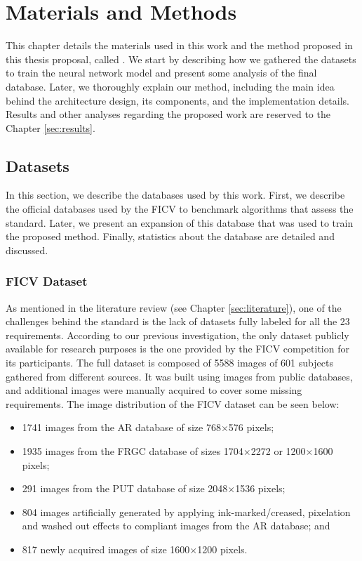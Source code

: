 \section{Materials and Methods} \label{sec:method}

This chapter details the materials used in this work and the method proposed in this thesis proposal, called \methodname. We start by describing how we gathered the datasets to train the neural network model and present some analysis of the final database. Later, we thoroughly explain our method, including the main idea behind the architecture design, its components, and the implementation details. Results and other analyses regarding the proposed work are reserved to the Chapter \ref{sec:results}.

\subsection{Datasets}

In this section, we describe the databases used by this work. First, we describe the official databases used by the FICV to benchmark algorithms that assess the \icao standard. Later, we present an expansion of this database that was used to train the proposed method. Finally, statistics about the database are detailed and discussed.

\subsubsection{FICV Dataset} \label{sec:database}

As mentioned in the literature review (see Chapter \ref{sec:literature}), one of the challenges behind the \icao standard is the lack of datasets fully labeled for all the 23 requirements. According to our previous investigation, the only dataset publicly available for research purposes is the one provided by the FICV competition for its participants. The full dataset is composed of 5588 images of 601 subjects gathered from different sources. It was built \adhoc using images from public databases, and additional images were manually acquired to cover some missing requirements. The image distribution of the FICV dataset can be seen below:

\begin{itemize}
\item 1741 images from the AR database \citep{martinez1998ar} of size 768$\times$576 pixels;
\item 1935 images from the FRGC database \citep{databaseFRGC} of sizes 1704$\times$2272 or 1200$\times$1600 pixels;
\item 291 images from the PUT database \citep{kasinski2008put} of size 2048$\times$1536 pixels;
\item 804 images artificially generated by applying ink-marked/creased, pixelation and washed out effects to compliant images from the AR database; and
\item 817 newly acquired images of size 1600$\times$1200 pixels.
\end{itemize}


